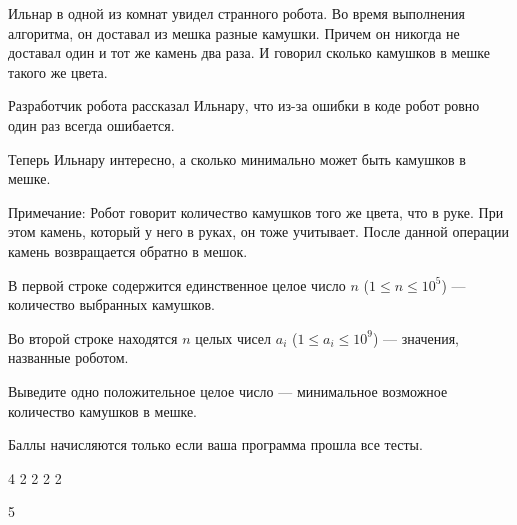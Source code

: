 
Ильнар в одной из комнат увидел странного робота. Во время выполнения алгоритма, он доставал из мешка разные камушки. 
Причем он никогда не доставал один и тот же камень два раза. И говорил сколько камушков в мешке такого же цвета.

Разработчик робота рассказал Ильнару, что из-за ошибки в коде робот ровно один раз всегда ошибается.

Теперь Ильнару интересно, а сколько минимально может быть камушков в мешке.

Примечание: Робот говорит количество камушков того же цвета, что в руке. При этом камень, который у него в руках, он тоже учитывает. После данной операции камень возвращается обратно в мешок.


В первой строке содержится единственное целое число $n$ ($1 \leq n \leq 10^5$) — количество выбранных камушков.

Во второй строке находятся $n$ целых чисел $a_i$ ($1 \leq a_i \leq 10^9$) — значения, названные роботом.

\outputfmtSection

Выведите одно положительное целое число — минимальное возможное количество камушков в мешке.

\markSection

Баллы начисляются только если ваша программа прошла все тесты.


\begin{myverbbox}[\small]{\vinput}
    4
    2 2 2 2
\end{myverbbox}
\begin{myverbbox}[\small]{\voutput}
    5
\end{myverbbox}

